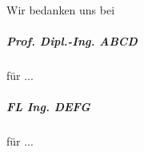 \begin{acknowledgements}
    Wir bedanken uns bei
    \subparagraph{Prof. Dipl.-Ing. ABCD} für ...
    \subparagraph{FL Ing. DEFG} für ...
\end{acknowledgements}
